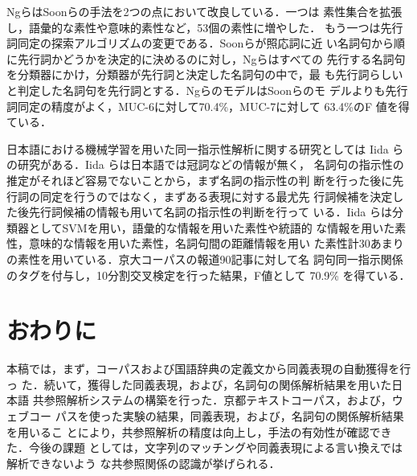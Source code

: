 \documentclass[japanese]{jnlp_1.4}
\begin{document}
  Ngら\cite{Ng2002a}はSoonらの手法を2つの点において改良している．一つは
  素性集合を拡張し，語彙的な素性や意味的素性など，53個の素性に増やした．
  もう一つは先行詞同定の探索アルゴリズムの変更である．Soonらが照応詞に近
  い名詞句から順に先行詞かどうかを決定的に決めるのに対し，Ngらはすべての
  先行する名詞句を分類器にかけ，分類器が先行詞と決定した名詞句の中で，最
  も先行詞らしいと判定した名詞句を先行詞とする．NgらのモデルはSoonらのモ
  デルよりも先行詞同定の精度がよく，MUC-6に対して70.4\%，MUC-7に対して
  63.4\%のF 値を得ている．

  日本語における機械学習を用いた同一指示性解析に関する研究としては Iida ら
  \cite{Iida2003}の研究がある．Iida らは日本語では冠詞などの情報が無く，
  名詞句の指示性の推定がそれほど容易でないことから，まず名詞の指示性の判
  断を行った後に先行詞の同定を行うのではなく，まずある表現に対する最尤先
  行詞候補を決定した後先行詞候補の情報も用いて名詞の指示性の判断を行って
  いる．Iida らは分類器としてSVMを用い，語彙的な情報を用いた素性や統語的
  な情報を用いた素性，意味的な情報を用いた素性，名詞句間の距離情報を用い
  た素性計30あまりの素性を用いている．京大コーパスの報道90記事に対して名
  詞句同一指示関係のタグを付与し，10分割交叉検定を行った結果，F値として
  70.9\% を得ている．
    


 \section{おわりに}

 本稿では，まず，コーパスおよび国語辞典の定義文から同義表現の自動獲得を行っ
 た．続いて，獲得した同義表現，および，名詞句の関係解析結果を用いた日本語
 共参照解析システムの構築を行った．京都テキストコーパス，および，ウェブコー
 パスを使った実験の結果，同義表現，および，名詞句の関係解析結果を用いるこ
 とにより，共参照解析の精度は向上し，手法の有効性が確認できた．今後の課題
 としては，文字列のマッチングや同義表現による言い換えでは解析できないよう
 な共参照関係の認識が挙げられる．
 
\end{document}
